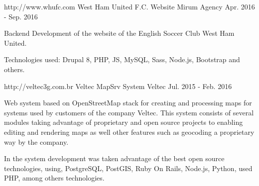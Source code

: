 \begin{cventries}

 \cventry
    {http://www.whufc.com} %
    {West Ham United F.C. Website} %
    {Mirum Agency} %
    {Apr. 2016 - Sep. 2016} %
    {
      \begin{cvitems} %
        \item {Backend Development of the website of the English Soccer Club West Ham United.}
         \item { Technologies used: Drupal 8, PHP, JS, MySQL, Sass, Node.js, Bootstrap and others.}
      \end{cvitems}
    }


 \cventry
    {http://veltec3g.com.br} %
    {Veltec MapSrv System} %
    {Veltec} %
    {Jul. 2015 - Feb. 2016} %
    {
      \begin{cvitems} %
        \item {Web system based on OpenStreetMap stack for creating and processing maps for systems used by customers of the company Veltec. This system consists of several modules taking advantage of proprietary and open source projects to enabling editing and rendering maps as well other features such as geocoding a proprietary way by the company.}
         \item {In the system development was taken advantage of the best open source technologies, using, PostgreSQL, PostGIS, Ruby On Rails, Node.js, Python, used PHP, among others technologies.}
      \end{cvitems}
    }

\end{cventries}
